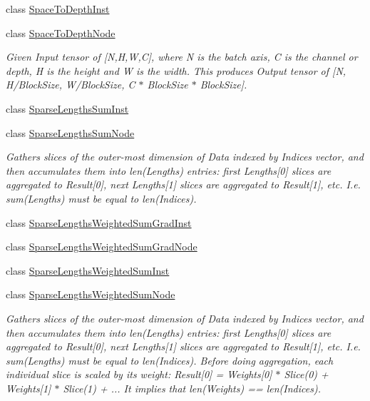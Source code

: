 \begin{DoxyCompactItemize}
class \hyperlink{classglow_1_1_space_to_depth_inst}{Space\+To\+Depth\+Inst}
\item 
class \hyperlink{classglow_1_1_space_to_depth_node}{Space\+To\+Depth\+Node}
\begin{DoxyCompactList}\small\item\em Given Input tensor of \mbox{[}N,H,W,C\mbox{]}, where N is the batch axis, C is the channel or depth, H is the height and W is the width. This produces Output tensor of \mbox{[}N, H/\+Block\+Size, W/\+Block\+Size, C $\ast$ Block\+Size $\ast$ Block\+Size\mbox{]}. \end{DoxyCompactList}\item 
class \hyperlink{classglow_1_1_sparse_lengths_sum_inst}{Sparse\+Lengths\+Sum\+Inst}
\item 
class \hyperlink{classglow_1_1_sparse_lengths_sum_node}{Sparse\+Lengths\+Sum\+Node}
\begin{DoxyCompactList}\small\item\em Gathers slices of the outer-\/most dimension of Data indexed by Indices vector, and then accumulates them into len(\+Lengths) entries\+: first Lengths\mbox{[}0\mbox{]} slices are aggregated to Result\mbox{[}0\mbox{]}, next Lengths\mbox{[}1\mbox{]} slices are aggregated to Result\mbox{[}1\mbox{]}, etc. I.\+e. sum(\+Lengths) must be equal to len(\+Indices). \end{DoxyCompactList}\item 
class \hyperlink{classglow_1_1_sparse_lengths_weighted_sum_grad_inst}{Sparse\+Lengths\+Weighted\+Sum\+Grad\+Inst}
\item 
class \hyperlink{classglow_1_1_sparse_lengths_weighted_sum_grad_node}{Sparse\+Lengths\+Weighted\+Sum\+Grad\+Node}
\item 
class \hyperlink{classglow_1_1_sparse_lengths_weighted_sum_inst}{Sparse\+Lengths\+Weighted\+Sum\+Inst}
\item 
class \hyperlink{classglow_1_1_sparse_lengths_weighted_sum_node}{Sparse\+Lengths\+Weighted\+Sum\+Node}
\begin{DoxyCompactList}\small\item\em Gathers slices of the outer-\/most dimension of Data indexed by Indices vector, and then accumulates them into len(\+Lengths) entries\+: first Lengths\mbox{[}0\mbox{]} slices are aggregated to Result\mbox{[}0\mbox{]}, next Lengths\mbox{[}1\mbox{]} slices are aggregated to Result\mbox{[}1\mbox{]}, etc. I.\+e. sum(\+Lengths) must be equal to len(\+Indices). Before doing aggregation, each individual slice is scaled by its weight\+: Result\mbox{[}0\mbox{]} = Weights\mbox{[}0\mbox{]} $\ast$ Slice(0) + Weights\mbox{[}1\mbox{]} $\ast$ Slice(1) + ... It implies that len(\+Weights) == len(\+Indices). \end{DoxyCompactList}\item 

\end{DoxyCompactItemize}
